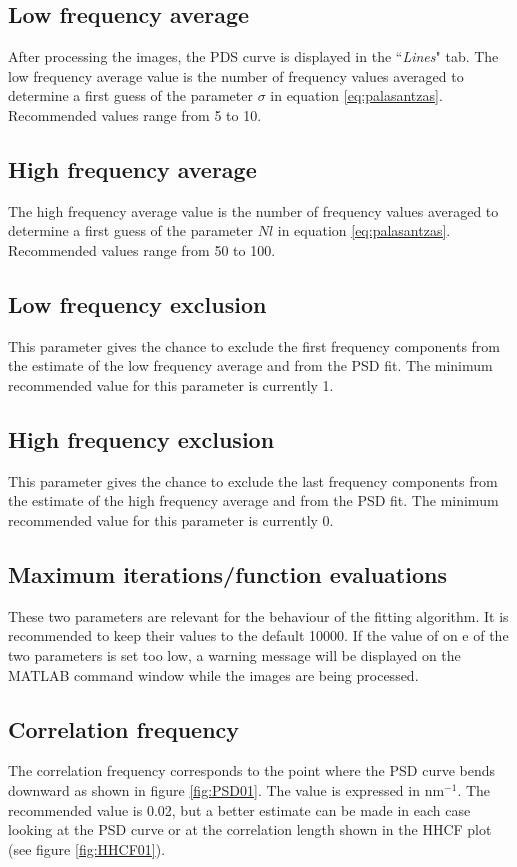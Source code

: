 \documentclass[12pt, a4paper, openany]{report}
\begin{document}
\subsection{Low frequency average}
After processing the images, the PDS curve is displayed in the ``\emph{Lines}" tab. The low frequency average value is the number of frequency values averaged to determine a first guess of the parameter $\sigma$ in equation \ref{eq:palasantzas}. Recommended values range from 5 to 10.
\subsection{High frequency average}
The high frequency average value is the number of frequency values averaged to determine a first guess of the parameter $Nl$ in equation \ref{eq:palasantzas}. Recommended values range from 50 to 100.
\subsection{Low frequency exclusion}
This parameter gives the chance to exclude the first frequency components from the estimate of the low frequency average and from the PSD fit. The minimum recommended value for this parameter is currently 1.
\subsection{High frequency exclusion}
This parameter gives the chance to exclude the last frequency components from the estimate of the high frequency average  and from the PSD fit. The minimum recommended value for this parameter is currently 0.
\subsection{Maximum iterations/function evaluations}
These two parameters are relevant for the behaviour of the fitting algorithm. It is recommended to keep their values to the default 10000. If the value of on e of the two parameters is set too low, a warning message will be displayed on the MATLAB command window while the images are being processed.
\subsection{Correlation frequency}
The correlation frequency corresponds to the point where the PSD curve bends downward as shown in figure \ref{fig:PSD01}. The value is expressed in nm$^{-1}$. The recommended value is 0.02, but a better estimate can be made in each case looking at the PSD curve or at the correlation length shown in the HHCF plot (see figure \ref{fig:HHCF01}).
\end{document}
